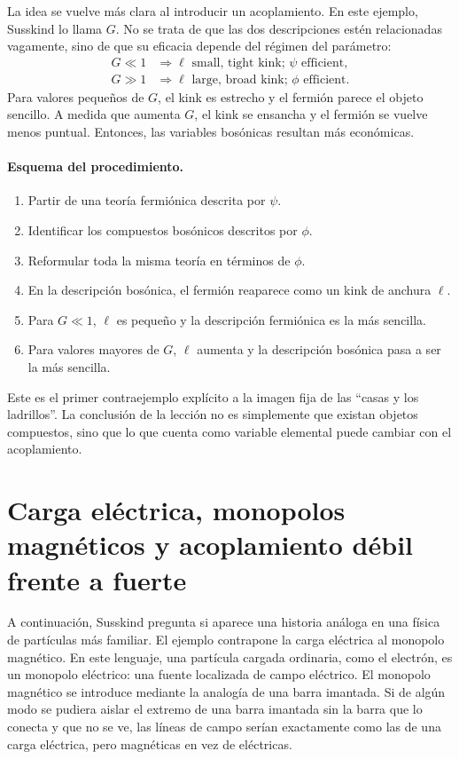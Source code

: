 La idea se vuelve más clara al introducir un acoplamiento. En este ejemplo, Susskind lo llama \(G\). No se trata de que las dos descripciones estén relacionadas vagamente, sino de que su eficacia depende del régimen del parámetro:
\begin{align}
G \ll 1
&\Rightarrow
\ell\text{ small, tight kink; }\psi\text{ efficient},\\
G \gg 1
&\Rightarrow
\ell\text{ large, broad kink; }\phi\text{ efficient}.
\end{align}
Para valores pequeños de \(G\), el kink es estrecho y el fermión parece el objeto sencillo. A medida que aumenta \(G\), el kink se ensancha y el fermión se vuelve menos puntual. Entonces, las variables bosónicas resultan más económicas.

\paragraph{Esquema del procedimiento.}
\begin{enumerate}
\item Partir de una teoría fermiónica descrita por \(\psi\).
\item Identificar los compuestos bosónicos descritos por \(\phi\).
\item Reformular toda la misma teoría en términos de \(\phi\).
\item En la descripción bosónica, el fermión reaparece como un kink de anchura \(\ell\).
\item Para \(G\ll 1\), \(\ell\) es pequeño y la descripción fermiónica es la más sencilla.
\item Para valores mayores de \(G\), \(\ell\) aumenta y la descripción bosónica pasa a ser la más sencilla.
\end{enumerate}

Este es el primer contraejemplo explícito a la imagen fija de las ``casas y los ladrillos''. La conclusión de la lección no es simplemente que existan objetos compuestos, sino que lo que cuenta como variable elemental puede cambiar con el acoplamiento.

\section{Carga eléctrica, monopolos magnéticos y acoplamiento débil frente a fuerte}

A continuación, Susskind pregunta si aparece una historia análoga en una física de partículas más familiar. El ejemplo contrapone la carga eléctrica al monopolo magnético. En este lenguaje, una partícula cargada ordinaria, como el electrón, es un monopolo eléctrico: una fuente localizada de campo eléctrico. El monopolo magnético se introduce mediante la analogía de una barra imantada. Si de algún modo se pudiera aislar el extremo de una barra imantada sin la barra que lo conecta y que no se ve, las líneas de campo serían exactamente como las de una carga eléctrica, pero magnéticas en vez de eléctricas.

